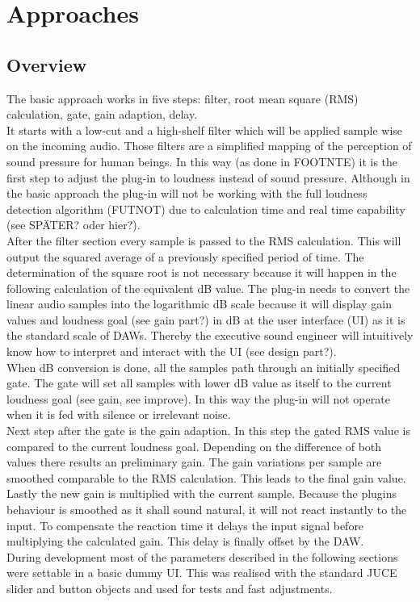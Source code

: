 \chapter{Approaches}
\label{chapter:approach}

\section{Overview}

The basic approach works in five steps: filter, root mean square (RMS) calculation, gate, gain adaption, delay.\\
It starts with a low-cut and a high-shelf filter which will be applied sample wise on the incoming audio. Those filters are a simplified mapping of the perception of sound pressure for human beings. In this way (as done in FOOTNTE) it is the first step to adjust the plug-in to loudness instead of sound pressure. Although in the basic approach the plug-in will not be working with the full loudness detection algorithm (FUTNOT) due to calculation time and real time capability (see SPÄTER? oder hier?).\\
After the filter section every sample is passed to the RMS calculation.  This will output the squared average of a previously specified period of time. The determination of the square root is not necessary because it will happen in the following calculation of the equivalent dB value. The plug-in needs to convert the linear audio samples into the logarithmic dB scale because it will display gain values and loudness goal (see gain part?) in dB at the user interface (UI) as it is the standard scale of DAWs. Thereby the executive sound engineer will intuitively know how to interpret and interact with the UI (see design part?).\\
When dB conversion is done, all the samples path through an initially specified gate. The gate will set all samples with lower dB value as itself to the current loudness goal (see gain, see improve). In this way the plug-in will not operate when it is fed with silence or irrelevant noise.\\
Next step after the gate is the gain adaption. In this step the gated RMS value is compared to the current loudness goal. Depending on the difference of both values there results an preliminary gain. The gain variations per sample are smoothed comparable to the RMS calculation. This leads to the final gain value.\\
Lastly the new gain is multiplied with the current sample. Because the plugins behaviour is smoothed as it shall sound natural, it will not react instantly to the input. To compensate the reaction time it delays the input signal before multiplying the calculated gain. This delay is finally offset by the DAW.\\ 
During development most of the parameters described in the following sections were settable in a basic dummy UI. This was realised with the standard JUCE slider and button objects and used for tests and fast adjustments.\\


